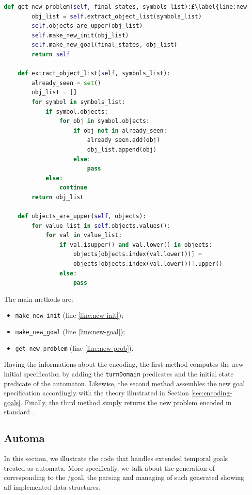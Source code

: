\begin{lstlisting}[language=Python, style=Python, escapechar = £,  label={code:fond-prob}, caption={The \texttt{Problem} class.}]
    def get_new_problem(self, final_states, symbols_list):£\label{line:new-prob}£
        obj_list = self.extract_object_list(symbols_list)
        self.objects_are_upper(obj_list)
        self.make_new_init(obj_list)
        self.make_new_goal(final_states, obj_list)
        return self

    def extract_object_list(self, symbols_list):
        already_seen = set()
        obj_list = []
        for symbol in symbols_list:
            if symbol.objects:
                for obj in symbol.objects:
                    if obj not in already_seen:
                        already_seen.add(obj)
                        obj_list.append(obj)
                    else:
                        pass
            else:
                continue
        return obj_list

    def objects_are_upper(self, objects):
        for value_list in self.objects.values():
            for val in value_list:
                if val.isupper() and val.lower() in objects:
                    objects[objects.index(val.lower())] = 
                    objects[objects.index(val.lower())].upper()
                else:
                    pass
\end{lstlisting}
The main methods are:
\begin{itemize}
\item \texttt{make\_new\_init} (line \ref{line:new-init});
\item \texttt{make\_new\_goal} (line \ref{line:new-goal});
\item \texttt{get\_new\_problem} (line \ref{line:new-prob}).
\end{itemize}
Having the informations about the \DFA encoding, the first method computes the new initial specification by adding the \texttt{turnDomain} predicates and the initial state predicate of the automaton. Likewise, the second method assembles the new goal specification accordingly with the theory illustrated in Section \ref{sec:encoding-goals}. Finally, the third method simply returns the new problem encoded in standard \PDDL.

\subsection{Automa}
In this section, we illustrate the code that handles extended temporal goals treated as automata. More specifically, we talk about the generation of \DFA corresponding to the \LTLf/\PLTL goal, the parsing and managing of such generated \DFA showing all implemented data structures.

